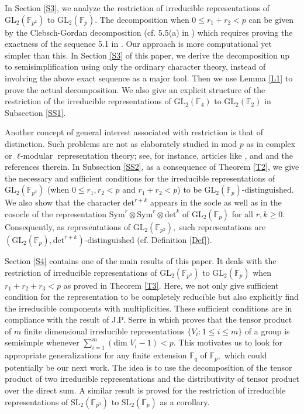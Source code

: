 \documentclass[10pt, reqno]{amsart}
\def\F{{\mathbb F}}
\numberwithin{equation}{section}
\theoremstyle{remark}
\begin{document}
In Section \ref{S3}, we analyze the restriction of irreducible representations of $\text{GL}_2(\F_{p^2})$ to $\text{GL}_2(\F_p).$ The decomposition when $0\leq r_1+r_2< p$ can be given by the Clebsch-Gordan decomposition (cf. 5.5(a) in \cite{DG}) which requires proving the exactness of the sequence 5.1 in \cite{DG}. Our approach is more computational yet simpler than this. In Section \ref{S3} of this paper, we derive the decomposition up to semisimplification using only the ordinary character theory, instead of involving the above exact sequence as a major tool. Then we use Lemma \ref{L1} to prove the actual decomposition. We also give an explicit structure of the restriction of the irreducible representations of $\text{GL}_2(\F_4)$ to $\text{GL}_2(\F_2)$ in Subsection \ref{SS1}.

Another concept of general interest associated with restriction is that of distinction. Such problems are not as elaborately studied in mod $p$ as in complex or $\ell\text{-modular}$ representation theory; see, for instance, articles like \cite{KC}, \cite{CLL} and \cite{VS} and the references therein. In Subsection \ref{SS2}, as a consequence of Theorem \ref{T2}, we give the necessary and sufficient conditions for the irreducible representations of $\mathrm{GL}_2(\F_{p^2})$ (when $0\leq r_1,r_2<p$ and $r_1+r_2<p$) to be $\text{GL}_2(\F_p)\text{-distinguished}.$ We also show that the character $\mathrm{det}^{r+k}$ appears in the socle as well as in the cosocle of the representation $\text{Sym}^{r}\otimes\text{Sym}^{r}\otimes\mathrm{det}^k$ of $\text{GL}_2(\F_p)$ for all $r,k\geq 0.$ Consequently, as representations of $\mathrm{GL}_2(\F_{p^2}),$ such representations are $(\text{GL}_2(\F_p),\mathrm{det}^{r+k})\text{-distinguished}$ (cf. Definition \ref{Def}).

Section \ref{S4} contains one of the main results of this paper. It deals with the restriction of irreducible representations of $\text{GL}_2(\F_{p^3})$ to $\text{GL}_2(\F_p)$ when $r_1+r_2+r_3<p$ as proved in Theorem \ref{T3}. Here, we not only give sufficient condition for the representation to be completely reducible but also explicitly find the irreducible components with multiplicities. These sufficient conditions are in compliance with the result of J.P. Serre in \cite{JPS} which proves that the tensor product of $m$ finite dimensional irreducible representations $\{V_i: 1\leq i\leq m\}$ of a group is semisimple whenever $\sum\limits_{i=1}^m(\text{dim }V_i-1)<p.$ This motivates us to look for appropriate generalizations for any finite extension $\F_q$ of $\F_p,$ which could potentially be our next work. The idea is to use the decomposition of the tensor product of two irreducible representations and the distributivity of tensor product over the direct sum. A similar result is proved for the restriction of irreducible representations of $\text{SL}_2(\F_{p^3})$ to $\text{SL}_2(\F_p)$ as a corollary.
\end{document}

